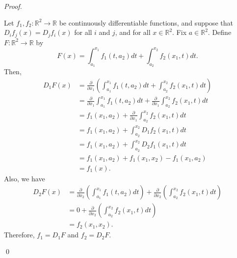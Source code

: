 \documentclass[12pt]{article}
\newenvironment{sol}
    {\emph{Proof.}
    }
    {
    \qed
    }
\begin{document}
  \begin{sol}
  Let $f_1, f_2 : \mathbb{R}^2 \to \mathbb{R}$ be continuously differentiable functions, and suppose that $D_if_j(x) = D_jf_i(x)$ for all $i$ and $j$, and for all $x \in \mathbb{R}^2$. Fix $a \in \mathbb{R}^2$. Define $F:\mathbb{R}^2 \to \mathbb{R}$ by $$F(x) = \int_{a_1}^{x_1}f_1(t,a_2)dt + \int_{a_2}^{x_2}f_2(x_1,t)dt.$$ Then, \begin{align*}
      D_1F(x) &= \frac{\partial}{\partial x_1}\left( \int_{a_1}^{x_1}f_1(t,a_2)dt + \int_{a_2}^{x_2}f_2(x_1,t)dt \right) \\ &= \frac{\partial}{\partial x_1} \int_{a_1}^{x_1}f_1(t,a_2)dt + \frac{\partial}{\partial x_1} \int_{a_2}^{x_2}f_2(x_1,t)dt \\ &= f_1(x_1,a_2) + \frac{\partial}{\partial x_1} \int_{a_2}^{x_2}f_2(x_1,t)dt \tag*{(By fundamental theorem of calculus)} \\ &= f_1(x_1,a_2) + \int_{a_2}^{x_2}D_1f_2(x_1,t)dt \tag*{(By theorem from the hint)} \\ &= f_1(x_1,a_2) + \int_{a_2}^{x_2}D_2f_1(x_1,t)dt \tag*{(From assumption)} \\ &= f_1(x_1,a_2) + f_1(x_1,x_2) - f_1(x_1,a_2) \tag*{(By fundamental theorem of calculus)} \\ &= f_1(x).
  \end{align*}
  Also, we have \begin{align*}
      D_2F(x) &= \frac{\partial}{\partial x_2}\left( \int_{a_1}^{x_1}f_1(t,a_2)dt \right) + \frac{\partial}{\partial x_2} \left( \int_{a_2}^{x_2}f_2(x_1,t)dt  \right) \\ &= 0 + \frac{\partial}{\partial x_2} \left( \int_{a_2}^{x_2}f_2(x_1,t)dt  \right) \tag*{(Since $f_1(t,a_2)$ is constant with respect to $x_2$)} \\ &= f_2(x_1,x_2). \tag*{(By fundamental theorem of calculus)}
  \end{align*}
  Therefore, $f_1 = D_1F$ and $f_2 = D_2F$.
  \end{sol}
  
  
  
\end{document}
